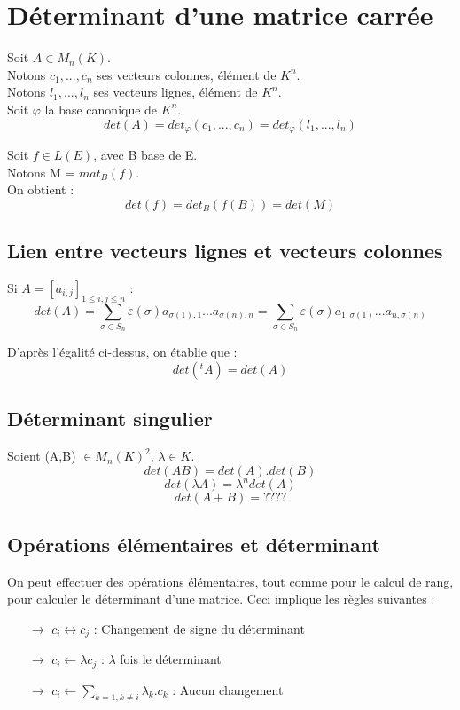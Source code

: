 \section{Déterminant d'une matrice carrée}
\begin{de}
Soit $A \in M_n(K)$.\\
Notons $c_1,...,c_n$ ses vecteurs colonnes, élément de $K^n$.\\
Notons $l_1,...,l_n$ ses vecteurs lignes, élément de $K^n$.\\
Soit $\varphi$ la base canonique de $K^n$.
$$det(A) = det_{\varphi}(c_1,...,c_n) = det_{\varphi}(l_1,...,l_n)$$
\end{de}
\begin{prop}
Soit $f \in L(E)$, avec B base de E.\\
Notons M = $mat_B(f)$.\\
On obtient :
$$det(f) = det_B(f(B)) = det(M)$$
\end{prop}
\subsection{Lien entre vecteurs lignes et vecteurs colonnes}
Si $A = [a_{i,j}]_{1 \leq i,j \leq n}$ :
$$det(A) = \sum_{\sigma \in S_n} \varepsilon(\sigma)a_{\sigma(1),1}...a_{\sigma(n),n} = \sum_{\sigma \in S_n} \varepsilon(\sigma)a_{1,\sigma(1)}...a_{n,\sigma(n)}$$
\begin{prop}
D'après l'égalité ci-dessus, on établie que :
$$det(^tA) = det(A)$$
\end{prop}
\subsection{Déterminant singulier}
Soient (A,B) $\in M_n(K)^2$, $\lambda \in K$.
$$det(AB) = det(A).det(B)$$
$$det(\lambda A) = \lambda^ndet(A)$$
$$det(A+B) = ????$$
\subsection{Opérations élémentaires et déterminant}
On peut effectuer des opérations élémentaires, tout comme pour le calcul de rang, pour calculer le déterminant d'une matrice. Ceci implique les règles suivantes :
\begin{itemize}
 \item[$\rightarrow$] $c_i \leftrightarrow c_j$ : Changement de signe du déterminant
 \item[$\rightarrow$] $c_i \leftarrow \lambda c_j$ : $\lambda$ fois le déterminant
 \item[$\rightarrow$] $c_i \leftarrow \underset{k=1,k\neq i}\sum \lambda_k.c_k$ : Aucun changement
\end{itemize}
